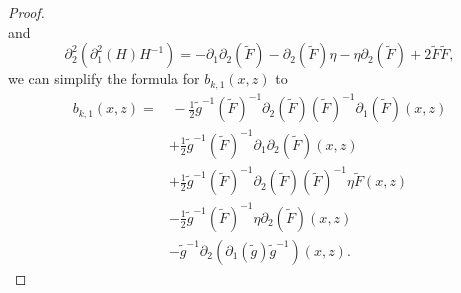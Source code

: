 \documentclass{amsart}
\theoremstyle{definition}
\theoremstyle{remark}
\numberwithin{equation}{section}
\begin{document}
\begin{proof}
\begin{equation*}
\end{equation*}
and
\begin{equation*}
    \partial_2^2 (\partial_1^2(H)H^{-1}) = -\partial_1\partial_2 (\tilde{F}) -\partial_2(\tilde{F}) \eta - \eta \partial_2(\tilde{F}) + 2\tilde{F} \tilde{F},
\end{equation*}
we can simplify the formula for $b_{k,1}(x,z)$ to
\begin{align*}
b_{k,1}(x,z) = & \hspace{2pt}   - \frac{1}{2} \tilde{g}^{-1}  (\tilde{F})^{-1} \partial_2 (\tilde{F})(\tilde{F})^{-1}  \partial_1 (\tilde{F})   (x,z)\\
    & + \frac{1}{2} \tilde{g}^{-1}  (\tilde{F})^{-1}  \partial_1\partial_2 (\tilde{F})   (x,z) \\
    & + \frac{1}{2}\tilde{g}^{-1} (\tilde{F})^{-1} \partial_2 (\tilde{F})(\tilde{F})^{-1} \eta \tilde{F} (x,z) \\
    &  - \frac{1}{2} \tilde{g}^{-1} (\tilde{F})^{-1}\eta \partial_2 (\tilde{F})(x,z) \\
    & - \tilde{g}^{-1} \partial_2 (\partial_1 (\tilde{g})\tilde{g}^{-1})(x,z).
\end{align*}


\end{proof}
\end{document}
